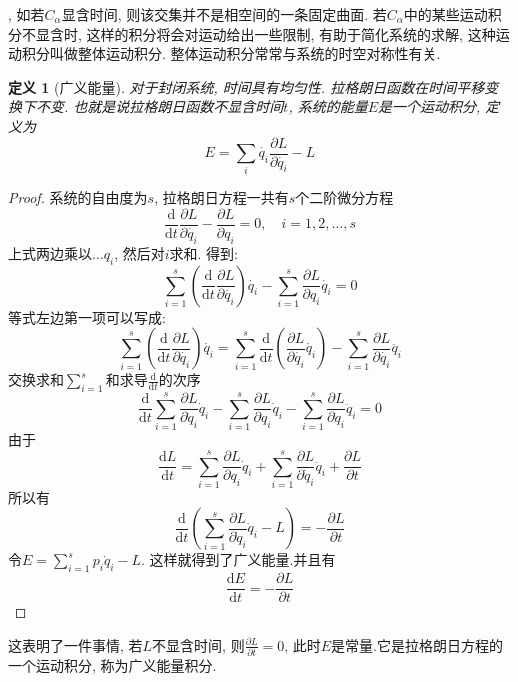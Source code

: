 \documentclass[a4paper,11pt]{book}
\newtheorem{definition}{\hspace{2em}定义}[section]
\newtheorem{proof}{证明}[section]
\begin{document}
, 如若$C_\alpha$显含时间, 则该交集并不是相空间的一条固定曲面. 若$C_\alpha$中的某些运动积分不显含时, 这样的积分将会对运动给出一些限制, 有助于简化系统的求解, 这种运动积分叫做整体运动积分. 整体运动积分常常与系统的时空对称性有关.
\begin{definition}[广义能量]
  对于封闭系统, 时间具有均匀性. 拉格朗日函数在时间平移变换下不变. 也就是说拉格朗日函数不显含时间$t$, 系统的能量$E$是一个运动积分, 定义为
  \begin{equation}\label{General Enery}
    E=\sum_{i}\dot{q_i}\frac{\partial{L}}{\partial{\dot{q_i}}}-L
  \end{equation}
\end{definition}
\begin{proof}
系统的自由度为$s$, 拉格朗日方程一共有$s$个二阶微分方程
\begin{equation*}
  \frac{\mathrm{d}}{\mathrm{d}t}\frac{\partial{L}}{\partial{\dot{q_i}}}-\frac{\partial{L}}{\partial{q_i}}=0,\quad i=1,2,\dots,s
\end{equation*}
上式两边乘以$\dots{q_i}$, 然后对$i$求和. 得到:
\begin{equation*}
  \sum_{i=1}^{s}\left(\frac{\mathrm{d}}{\mathrm{d}t}\frac{\partial{L}}{\partial{\dot{q_i}}}\right)\dot{q_i}-\sum_{i=1}^{s}\frac{\partial{L}}{\partial{q_i}}\dot{q_i}=0
\end{equation*}
等式左边第一项可以写成:
\begin{equation*}
  \sum_{i=1}^{s}\left(\frac{\mathrm{d}}{\mathrm{d}t}\frac{\partial{L}}{\partial{\dot{q_i}}}\right)\dot{q_i}=\sum_{i=1}^{s}\frac{\mathrm{d}}{\mathrm{d}t}\left(\frac{\partial L}{\partial{\dot{q_i}}}\dot{q_i}\right)-\sum_{i=1}^{s}\frac{\partial L}{\partial{\dot{q_i}}}\ddot{q_i}
\end{equation*}
交换求和$\sum_{i=1}^{s}$和求导$\frac{\mathrm{d}}{\mathrm{d}t}$的次序
\begin{equation*}
  \frac{\mathrm{d}}{\mathrm{d} t } \sum _ { i = 1 } ^ { s } \frac { \partial L } { \partial\dot{q}_{i}}\dot{q}_{i}-\sum_{i=1}^{s}\frac{\partial L}{\partial q_{i}}\dot{q}_{i}-\sum_{i=1}^{s}\frac{\partial L}{\partial\dot{q}_{i}}\ddot{q}_{i}=0
\end{equation*}
由于
\begin{equation*}
  \frac{\mathrm{d}L}{\mathrm{d}t}=\sum_{i=1}^{s}\frac{\partial L}{\partial q_{i}}\dot{q}_{i}+\sum_{i=1}^{s}\frac{\partial L}{\partial\dot{q}_{i}}\ddot{q}_{i}+\frac{\partial L}{\partial t}
\end{equation*}
所以有
\begin{equation*}
  \frac{\mathrm{d}}{\mathrm{d}t}\left(\sum_{i=1}^{s}\frac{\partial L}{\partial\dot{q}_{i}}\dot{q}_{i}-L\right)=-\frac{\partial L}{\partial t}
\end{equation*}
令$E=\sum_{i=1}^{s}p_{i}\dot{q}_{i}-L$. 这样就得到了广义能量.并且有
\begin{equation*}
  \frac{\mathrm{d}E}{\mathrm{d}t}=-\frac{\partial L}{\partial t}
\end{equation*}
\end{proof}
这表明了一件事情, 若$L$不显含时间, 则$\frac{\partial L}{\partial t}=0$, 此时$E$是常量.它是拉格朗日方程的一个运动积分, 称为广义能量积分.
\end{document}
